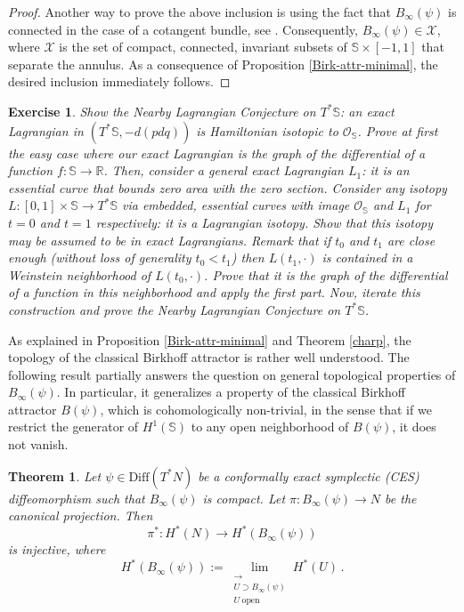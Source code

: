 \documentclass{article}
\newcommand{\1}{\mathbbm{1}}
\newcommand{\numberset}{\mathbb}
\newcommand{\R}{\numberset{R}}
\newcommand{\sphere}{\mathbb{S}}
\newtheorem{thm}{Theorem}[section]
\newtheorem{exo}{Exercise}
\theoremstyle{remark}
\begin{document}
\begin{proof}
\indent Another way to prove the above inclusion is using the fact that $B_{\infty}(\psi)$ is connected in the case of a cotangent bundle, see \cite{AGIV24}. Consequently, $B_{\infty}(\psi) \in \mathcal{X}$, where $\mathcal{X}$ is the set of compact, connected, invariant subsets of $\mathbb{S} \times [-1 , 1]$ that separate the annulus. As a consequence of Proposition \ref{Birk-attr-minimal}, the desired inclusion immediately follows. 
\end{proof}
\begin{exo}\label{ex:nlc}
\textnormal{Show the Nearby Lagrangian Conjecture on $T^*\sphere$: an exact Lagrangian in $(T^*\mathbb{S}, -d(pdq))$ is Hamiltonian isotopic to $\mathcal{O}_\sphere$. Prove at first the easy case where our exact Lagrangian is the graph of the differential of a function $f:\sphere\rightarrow \R$. Then, consider a general exact Lagrangian $L_1$: it is an essential curve that bounds zero area with the zero section. Consider any isotopy $L:[0, 1]\times\sphere\rightarrow T^*\sphere$ via embedded, essential curves with image $\mathcal{O}_\sphere$ and $L_1$ for $t = 0$ and $t = 1$ respectively: it is a Lagrangian isotopy. Show that this isotopy may be assumed to be in exact Lagrangians. Remark that if $t_0$ and $t_1$ are close enough (without loss of generality $t_0<t_1$) then $L(t_1, \cdot)$ is contained in a Weinstein neighborhood of $L(t_0, \cdot)$. Prove that it is the graph of the differential of a function in this neighborhood and apply the first part. Now, iterate this construction and prove the Nearby Lagrangian Conjecture on $T^*\sphere$.}
\end{exo}
As explained in Proposition \ref{Birk-attr-minimal} and Theorem \ref{charp}, the topology of the classical Birkhoff attractor is rather well understood. The following result partially answers the question on general topological properties of $B_{\infty}(\psi)$. In particular, it generalizes a property of the classical Birkhoff attractor $B(\psi)$, which is cohomologically non-trivial, in the sense that if we restrict the generator of $H^1(\sphere)$ to any open neighborhood of $B(\psi)$, it does not vanish.
\begin{thm}
Let $\psi \in \mathrm{Diff}(T^*N)$ be a conformally exact symplectic (CES) diffeomorphism such that $B_{\infty}(\psi)$ is compact. Let $\pi: B_{\infty}(\psi) \rightarrow N$ be the canonical projection. Then 
$$\pi^*:H^*(N)\rightarrow H^*(B_{\infty}(\psi))$$ 
is injective, where \begin{equation*}
    H^*(B_{\infty}(\psi)):=\lim_{\substack{\longrightarrow \\ U\supset B_{\infty}(\psi) \\ U \ \mathrm{open}}} H^*(U)\, .
\end{equation*}
\end{thm}
\end{document}
